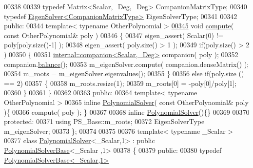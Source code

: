 \begin{DoxyCode}
00338 
00339     \textcolor{keyword}{typedef} \hyperlink{group___core___module_class_eigen_1_1_matrix}{Matrix<Scalar,\_Deg,\_Deg>}                 CompanionMatrixType;
00340     \textcolor{keyword}{typedef} \hyperlink{group___eigenvalues___module}{EigenSolver<CompanionMatrixType>}         EigenSolverType;
00341 
00342   \textcolor{keyword}{public}:
00344     \textcolor{keyword}{template}< \textcolor{keyword}{typename} OtherPolynomial >
\hyperlink{class_eigen_1_1_polynomial_solver_ac3ceae48528f3798d44c15a025cb03b8}{00345}     \textcolor{keywordtype}{void} \hyperlink{class_eigen_1_1_polynomial_solver_ac3ceae48528f3798d44c15a025cb03b8}{compute}( \textcolor{keyword}{const} OtherPolynomial& poly )
00346     \{
00347       eigen\_assert( Scalar(0) != poly[poly.size()-1] );
00348       eigen\_assert( poly.size() > 1 );
00349       \textcolor{keywordflow}{if}(poly.size() >  2 )
00350       \{
00351         \hyperlink{class_eigen_1_1internal_1_1companion}{internal::companion<Scalar,\_Deg>} companion( poly );
00352         companion.\hyperlink{class_eigen_1_1internal_1_1companion_a7362d054f04f6d554fb6c8a279287000}{balance}();
00353         m\_eigenSolver.compute( companion.denseMatrix() );
00354         m\_roots = m\_eigenSolver.eigenvalues();
00355       \}
00356       \textcolor{keywordflow}{else} \textcolor{keywordflow}{if}(poly.size () == 2)
00357       \{
00358         m\_roots.resize(1);
00359         m\_roots[0] = -poly[0]/poly[1];
00360       \}
00361     \}
00362 
00363   \textcolor{keyword}{public}:
00364     \textcolor{keyword}{template}< \textcolor{keyword}{typename} OtherPolynomial >
00365     \textcolor{keyword}{inline} \hyperlink{class_eigen_1_1_polynomial_solver}{PolynomialSolver}( \textcolor{keyword}{const} OtherPolynomial& poly )\{
00366       compute( poly ); \}
00367 
00368     \textcolor{keyword}{inline} \hyperlink{class_eigen_1_1_polynomial_solver}{PolynomialSolver}()\{\}
00369 
00370   \textcolor{keyword}{protected}:
00371     \textcolor{keyword}{using}                   PS\_Base::m\_roots;
00372     EigenSolverType         m\_eigenSolver;
00373 \};
00374 
00375 
00376 \textcolor{keyword}{template}< \textcolor{keyword}{typename} \_Scalar >
00377 \textcolor{keyword}{class }\hyperlink{class_eigen_1_1_polynomial_solver}{PolynomialSolver}<\_Scalar,1> : \textcolor{keyword}{public} \hyperlink{class_eigen_1_1_polynomial_solver_base}{PolynomialSolverBase}<\_Scalar
      ,1>
00378 \{
00379   \textcolor{keyword}{public}:
00380     \textcolor{keyword}{typedef} \hyperlink{class_eigen_1_1_polynomial_solver_base}{PolynomialSolverBase<\_Scalar,1>}    

\end{DoxyCode}
